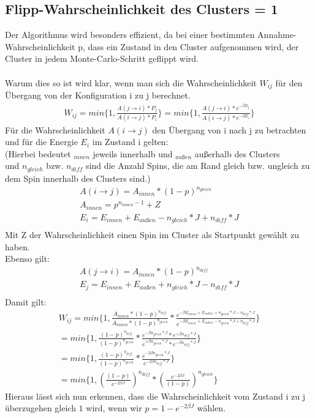 \subsection{Flipp-Wahrscheinlichkeit des Clusters = 1}
Der Algorithmus wird besonders effizient, da bei einer bestimmten Annahme-Wahrscheinlichkeit p, dass ein Zustand in den Cluster aufgenommen wird, der Cluster in jedem Monte-Carlo-Schritt geflippt wird.\\\\
Warum dies so ist wird klar, wenn man sich die Wahrscheinlichkeit $W_{ij}$ für den Übergang von der Konfiguration i zu j berechnet.
\begin{align}
W_{ij} = min\{1, \frac{A(j \rightarrow i) * P_j}{A(i \rightarrow j) * P_i} \} = min\{1, \frac{A(j \rightarrow i) * e^{-\beta E_j}}{A(i \rightarrow j) * e^{-\beta E_i}} \}
\end{align}
Für die Wahrscheinlichkeit $A(i \rightarrow j)$ den Übergang von i nach j zu betrachten und für die Energie $E_i$ im Zustand i gelten:\\
(Hierbei bedeutet $_{innen}$ jeweils innerhalb und $_{außen}$ außerhalb des Clusters\\
und $n_{gleich}$ bzw. $n_{diff}$ sind die Anzahl Spins, die am Rand gleich bzw. ungleich zu dem Spin innerhalb des Clusters sind.)
\begin{align}
A(i \rightarrow j)=A_{innen} * (1 - p)^{n_{gleich}}\\
A_{innen} = p^{n_{innen}-1} + Z\\
E_i = E_{innen} + E_{außen} - n_{gleich} * J + n_{diff} * J\\
\end{align}
Mit Z der Wahrscheinlichkeit einen Spin im Cluster als Startpunkt gewählt zu haben.\\
Ebenso gilt:
\begin{align}
A(j \rightarrow i)=A_{innen} * (1 - p)^{n_{diff}}\\
E_j = E_{innen} + E_{außen} + n_{gleich} * J - n_{diff} * J\\
\end{align}
Damit gilt:
\begin{align}
W_{ij} = min\{1, \frac{A_{innen}*(1-p)^{n_{diff}}}{A_{innen}*(1-p)^{n_{gleich}}} * \frac{e^{-\beta E_{innen} + E_{außen} + n_{gleich} * J - n_{diff} * J}}{e^{-\beta E_{innen} + E_{außen} - n_{gleich} * J + n_{diff} * J}}\} \\
= min\{1, \frac{(1-p)^{n_{diff}}}{(1-p)^{n_{gleich}}} * \frac{e^{-\beta n_{gleich} * J} * e^{+\beta n_{diff} * J}}{e^{+\beta n_{gleich} * J} * e^{-\beta n_{diff} * J}}\}\\
= min\{1, \frac{(1-p)^{n_{diff}}}{(1-p)^{n_{gleich}}} * \frac{e^{-2\beta n_{gleich} * J}}{e^{-2\beta n_{diff} * J}}\}\\
= min\{1, \left(\frac{(1-p)}{e^{-2\beta J}}\right)^{n_{diff}} * \left(\frac{e^{-2\beta J}}{(1-p)}\right)^{n_{gleich}}\}
\end{align}
Hieraus lässt sich nun erkennen, dass die Wahrscheinlichkeit vom Zustand i zu j überzugehen gleich $1$ wird, wenn wir $p = 1 - e^{-2\beta J}$ wählen.

